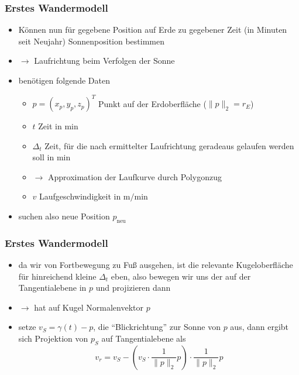 \documentclass[aspectratio=43]{beamer}
\begin{document}
\begin{frame}
    \frametitle{Erstes Wandermodell}
    \begin{itemize}
        \item Können nun für gegebene Position auf Erde zu gegebener Zeit (in Minuten seit Neujahr)
            Sonnenposition bestimmen
        \item[]$\rightarrow$ Laufrichtung beim Verfolgen der Sonne
        \item benötigen folgende Daten
            \begin{itemize}
                \item $p=(x_p, y_p, z_p)^T$ Punkt auf der Erdoberfläche ($\|p\|_2 =
                    r_E$)
                \item $t$ Zeit in min
                \item $\Delta_t$ Zeit, für die nach ermittelter Laufrichtung geradeaus
                    gelaufen werden soll in min
                \item[]$\rightarrow$ Approximation der Laufkurve durch Polygonzug
                \item $v$ Laufgeschwindigkeit in m$/$min
            \end{itemize}
        \item suchen also neue Position $p_{\text{neu}}$
    \end{itemize}
\end{frame}

\begin{frame}
    \frametitle{Erstes Wandermodell}
    \begin{itemize}
        \item da wir von Fortbewegung zu Fuß ausgehen, ist die relevante Kugeloberfläche
            für hinreichend kleine $\Delta_t$ eben, also bewegen wir uns der auf der
            Tangentialebene in $p$ und projizieren dann
        \item[]$\rightarrow$ hat auf Kugel Normalenvektor $p$
        \item setze $v_S = \gamma(t) - p$, die \enquote{Blickrichtung} zur Sonne von
            $p$ aus, dann ergibt sich Projektion von $p_S$ auf Tangentialebene als
            \begin{equation*}
                v_r = v_S - \left( v_S \cdot \frac1{\|p\|_2}p \right) \cdot
                \frac1{\|p\|_2} p
            \end{equation*}
    \end{itemize}
\end{frame}
\end{document}
